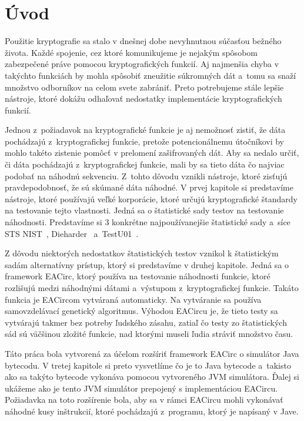 \chapter*{Úvod}
\label{chap:introduction}

Použitie kryptografie sa stalo v dnešnej dobe nevyhnutnou súčasťou bežného života. Každé spojenie, cez ktoré komunikujeme je nejakým spôsobom zabezpečené práve pomocou kryptografických funkcií. Aj najmenšia chyba v takýchto funkciách by mohla spôsobiť zneužitie súkromných dát a~tomu sa snaží množstvo odborníkov na celom svete zabrániť. Preto potrebujeme stále lepšie nástroje, ktoré dokážu odhaľovať nedostatky implementácie kryptografických funkcií.

Jednou z~požiadavok na kryptografické funkcie je aj nemožnosť zistiť, že dáta pochádzajú z~kryptografickej funkcie, pretože potencionálnemu útočníkovi by mohlo takéto zistenie pomôcť v prelomení zašifrovaných dát. Aby sa nedalo určiť, či dáta pochádzajú z~kryptografickej funkcie, mali by sa tieto dáta čo najviac podobať na náhodnú sekvenciu. Z~tohto dôvodu vznikli nástroje, ktoré zisťujú pravdepodobnosť, že sú skúmané dáta náhodné. V prvej kapitole si predstavíme nástroje, ktoré používajú veľké korporácie, ktoré určujú kryptografické štandardy na testovanie tejto vlastnosti. Jedná sa o štatistické sady testov na testovanie náhodnosti. Predstavíme si 3 konkrétne najpoužívanejšie štatistické sady a~síce {STS NIST}~\parencite{nist-sts-documentation}, Dieharder~\parencite{dieharder} a~TestU01~\parencite{testu01}. 

Z dôvodu niektorých nedostatkov štatistických testov vznikol k štatistickým sadám alternatívny prístup, ktorý si predstavíme v druhej kapitole. Jedná sa o framework EACirc, ktorý používa na testovanie náhodnosti funkcie, ktoré rozlišujú medzi náhodnými dátami a~výstupom z~kryptografickej funkcie. Takáto funkcia je EACircom vytváraná automaticky. Na vytváranie sa používa samovzdelávací genetický algoritmus. Výhodou EACircu je, že tieto testy sa vytvárajú takmer bez potreby ľudského zásahu, zatiaľ čo testy zo štatistických sád sú väčšinou zložité funkcie, nad ktorými museli ľudia stráviť množstvo času.

Táto práca bola vytvorená za účelom rozšíriť framework EACirc o simulátor Java bytecodu. V tretej kapitole si preto vysvetlíme čo je to Java bytecode a~takisto ako sa takýto bytecode vykonáva pomocou vytvoreného JVM simulátora. Ďalej si ukážeme ako je tento JVM simulátor prepojený s implementáciou EACircu. Požiadavka na toto rozšírenie bola, aby sa v rámci EACircu mohli vykonávať náhodné kusy inštrukcií, ktoré pochádzajú z~programu, ktorý je napísaný v Jave. 

